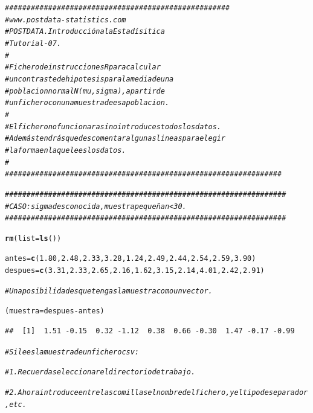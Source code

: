 \documentclass[10pt,a4paper]{article}\usepackage[]{graphicx}\usepackage[]{color}
\makeatletter
\newcommand{\hlnum}[1]{\textcolor[rgb]{0.686,0.059,0.569}{#1}}%
\newcommand{\hlcom}[1]{\textcolor[rgb]{0.678,0.584,0.686}{\textit{#1}}}%
\newcommand{\hlopt}[1]{\textcolor[rgb]{0,0,0}{#1}}%
\newcommand{\hlstd}[1]{\textcolor[rgb]{0.345,0.345,0.345}{#1}}%
\newcommand{\hlkwb}[1]{\textcolor[rgb]{0.69,0.353,0.396}{#1}}%
\newcommand{\hlkwc}[1]{\textcolor[rgb]{0.333,0.667,0.333}{#1}}%
\newcommand{\hlkwd}[1]{\textcolor[rgb]{0.737,0.353,0.396}{\textbf{#1}}}%
\newenvironment{kframe}{%
 \def\at@end@of@kframe{}%
 \ifinner\ifhmode%
  \def\at@end@of@kframe{\end{minipage}}%
  \begin{minipage}{\columnwidth}%
 \fi\fi%
 \def\FrameCommand##1{\hskip\@totalleftmargin \hskip-\fboxsep
 \colorbox{shadecolor}{##1}\hskip-\fboxsep
     \hskip-\linewidth \hskip-\@totalleftmargin \hskip\columnwidth}%
 \MakeFramed {\advance\hsize-\width
   \@totalleftmargin\z@ \linewidth\hsize
   \@setminipage}}%
 {\par\unskip\endMakeFramed%
 \at@end@of@kframe}
\newenvironment{knitrout}{}{} %
\newcounter {cont01}
\makeatother
\begin{document}
\begin{knitrout}
\color{fgcolor}\begin{kframe}
\begin{alltt}
\hlcom{####################################################}
\hlcom{# www.postdata-statistics.com}
\hlcom{# POSTDATA. Introducción a la Estadísitica}
\hlcom{# Tutorial-07.}
\hlcom{#}
\hlcom{# Fichero de instrucciones R para calcular}
\hlcom{# un contraste de hipotesis para la media de una}
\hlcom{# poblacion normal N(mu,sigma), a partir de}
\hlcom{# un fichero con una muestra de esa poblacion.}
\hlcom{#}
\hlcom{# El fichero no funcionara si no introduces todos los datos.}
\hlcom{# Además tendrás que descomentar algunas lineas para elegir}
\hlcom{# la forma en la que lees los datos.}
\hlcom{#}
\hlcom{################################################################}


\hlcom{#################################################################}
\hlcom{# CASO:  sigma desconocida, muestra pequeña  n<30.}
\hlcom{#################################################################}

\hlkwd{rm}\hlstd{(}\hlkwc{list} \hlstd{=} \hlkwd{ls}\hlstd{())}

\hlstd{antes} \hlkwb{=} \hlkwd{c}\hlstd{(}\hlnum{1.80}\hlstd{,} \hlnum{2.48}\hlstd{,} \hlnum{2.33}\hlstd{,} \hlnum{3.28}\hlstd{,} \hlnum{1.24}\hlstd{,} \hlnum{2.49}\hlstd{,} \hlnum{2.44}\hlstd{,} \hlnum{2.54}\hlstd{,} \hlnum{2.59}\hlstd{,} \hlnum{3.90}\hlstd{)}
\hlstd{despues} \hlkwb{=} \hlkwd{c}\hlstd{(}\hlnum{3.31}\hlstd{,} \hlnum{2.33}\hlstd{,} \hlnum{2.65}\hlstd{,} \hlnum{2.16}\hlstd{,} \hlnum{1.62}\hlstd{,} \hlnum{3.15}\hlstd{,} \hlnum{2.14}\hlstd{,} \hlnum{4.01}\hlstd{,} \hlnum{2.42}\hlstd{,} \hlnum{2.91}\hlstd{)}

\hlcom{# Una posibilidad es que tengas la muestra como un vector.}

\hlstd{(muestra} \hlkwb{=} \hlstd{despues} \hlopt{-} \hlstd{antes)}
\end{alltt}
\begin{verbatim}
##  [1]  1.51 -0.15  0.32 -1.12  0.38  0.66 -0.30  1.47 -0.17 -0.99
\end{verbatim}
\begin{alltt}
\hlcom{# Si lees la muestra de un fichero csv:}

\hlcom{# 1. Recuerda seleccionar el directorio de trabajo.}

\hlcom{# 2. Ahora introduce entre las comillas el nombre del fichero, y el tipo de separador, etc.}


\end{alltt}
\end{kframe}
\end{knitrout}
\end{document}
